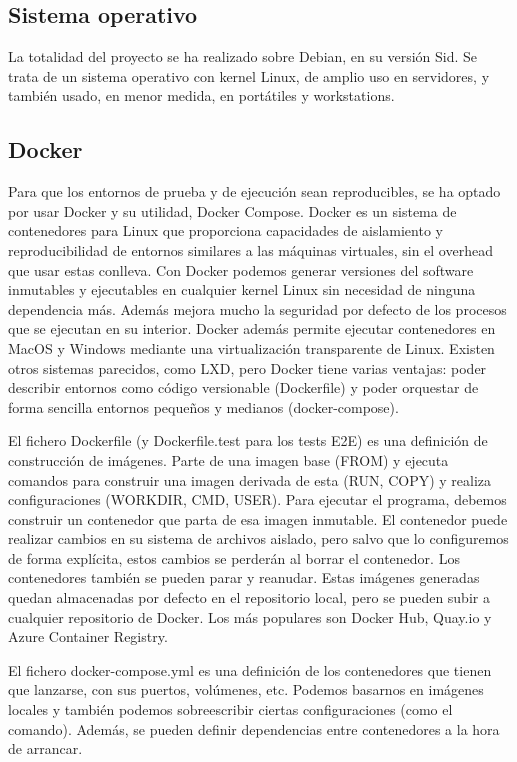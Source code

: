\documentclass[openright,twoside,12pt]{book}
\begin{document}
\subsection{Sistema operativo}
La totalidad del proyecto se ha realizado sobre Debian, en su versión Sid. Se trata de un sistema operativo con kernel Linux, de amplio uso en servidores, y también usado, en menor medida, en portátiles y workstations.

\subsection{Docker}
Para que los entornos de prueba y de ejecución sean reproducibles, se ha optado por usar Docker y su utilidad, Docker Compose.
Docker es un sistema de contenedores para Linux que proporciona capacidades de aislamiento y reproducibilidad de entornos similares a las máquinas virtuales, sin el overhead que usar estas conlleva. Con Docker podemos generar versiones del software inmutables y ejecutables en cualquier kernel Linux sin necesidad de ninguna dependencia más.
Además mejora mucho la seguridad por defecto de los procesos que se ejecutan en su interior.
Docker además permite ejecutar contenedores en MacOS y Windows mediante una virtualización transparente de Linux.
Existen otros sistemas parecidos, como LXD, pero Docker tiene varias ventajas: poder describir entornos como código versionable (Dockerfile) y poder orquestar de forma sencilla entornos pequeños y medianos (docker-compose).

El fichero Dockerfile (y Dockerfile.test para los tests E2E) es una definición de construcción de imágenes. Parte de una imagen base (FROM) y ejecuta comandos para construir una imagen derivada de esta (RUN, COPY) y realiza configuraciones (WORKDIR, CMD, USER). Para ejecutar el programa, debemos construir un contenedor que parta de esa imagen inmutable. El contenedor puede realizar cambios en su sistema de archivos aislado, pero salvo que lo configuremos de forma explícita, estos cambios se perderán al borrar el contenedor. Los contenedores también se pueden parar y reanudar. Estas imágenes generadas quedan almacenadas por defecto en el repositorio local, pero se pueden subir a cualquier repositorio de Docker. Los más populares son Docker Hub, Quay.io y Azure Container Registry.

El fichero docker-compose.yml es una definición de los contenedores que tienen que lanzarse, con sus puertos, volúmenes, etc. Podemos basarnos en imágenes locales y también podemos sobreescribir ciertas configuraciones (como el comando). Además, se pueden definir dependencias entre contenedores a la hora de arrancar.
\end{document}
